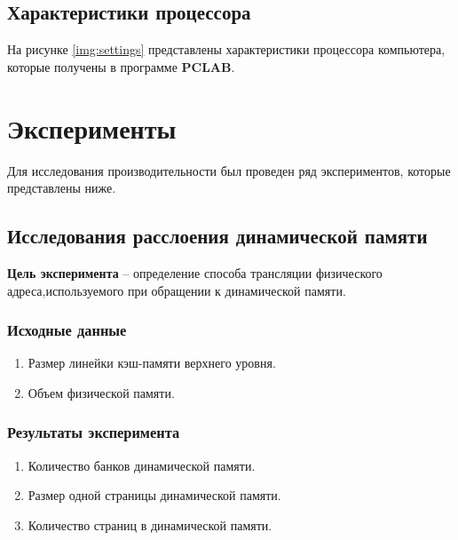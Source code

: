\section{Характеристики процессора}

На рисунке \ref{img:settings} представлены характеристики процессора компьютера, которые получены в программе \textbf{PCLAB}.




\chapter{Эксперименты}

Для исследования производительности был проведен ряд экспериментов, которые представлены ниже.


\section{Исследования расслоения динамической памяти}

\textbf{Цель эксперимента} -- определение   способа   трансляции   физического   адреса,используемого при обращении к динамической памяти.

\subsection{Исходные данные}
\begin{enumerate}
	\item Размер линейки кэш-памяти верхнего уровня.
	\item Объем физической памяти.
\end{enumerate}

\subsection{Результаты эксперимента}
\begin{enumerate}
	\item Количество банков динамической памяти.
	\item Размер одной страницы динамической памяти.
	\item Количество страниц в динамической памяти.
\end{enumerate}



